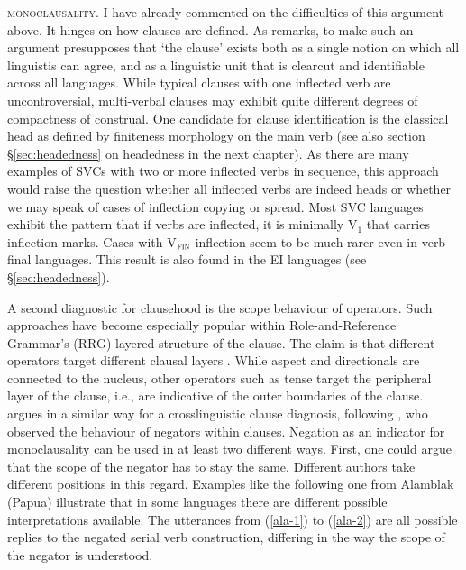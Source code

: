 \textsc{monoclausality}. I have already commented on the difficulties of this argument above. It hinges on how clauses are defined. As \citet[26]{lane2008kalam} remarks, to make such an argument presupposes that `the clause' exists both as a single notion on which all linguistis can agree, and as a linguistic unit that is clearcut and identifiable across all languages. While typical clauses with one inflected verb are uncontroversial, multi-verbal clauses may exhibit quite different degrees of compactness of construal. One candidate for clause identification is the classical head as defined by finiteness morphology on the main verb (see also section §\ref{sec:headedness} on headedness in the next chapter). As there are many examples of SVCs with two or more inflected verbs in sequence, this approach would raise the question whether all inflected verbs are indeed heads or whether we may speak of cases of inflection copying or spread. Most SVC languages exhibit the pattern that if verbs are inflected, it is minimally V$_1$ that carries inflection marks. Cases with V$_{\textsc{fin}}$ inflection seem to be much rarer even in verb-final languages. This result is also found in the EI languages (see §\ref{sec:headedness}).

A second diagnostic for clausehood is the scope behaviour of operators. Such approaches have become especially popular within Role-and-Reference Grammar's (RRG) layered structure of the clause. The claim is that different operators target different clausal layers \citep{foley1984functional}. While aspect and directionals are connected to the nucleus, other operators such as tense target the peripheral layer of the clause, i.e., are indicative of the outer boundaries of the clause. \citet{haspelmath2016serial} argues in a similar way for a crosslinguistic clause diagnosis, following \citet{bohnemeyer2007principles}, who observed the behaviour of negators within clauses. Negation as an indicator for monoclausality can be used in at least two different ways. First, one could argue that the scope of the negator has to stay the same. Different authors take different positions in this regard. Examples like the following one from Alamblak (Papua) illustrate that in some languages there are different possible interpretations available. The utterances from (\ref{ala-1}) to (\ref{ala-2}) are all possible replies to the negated serial verb construction, differing in the way the scope of the negator is understood.

